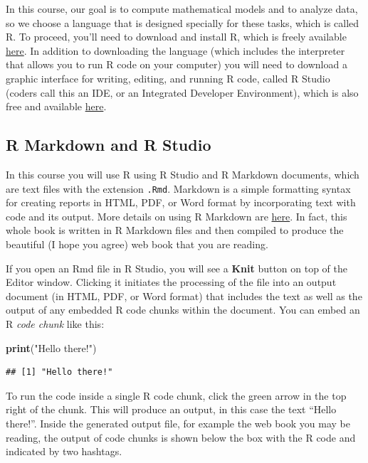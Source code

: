 \documentclass[
]{book}
\newenvironment{Shaded}{\begin{snugshade}}{\end{snugshade}}
\newcommand{\KeywordTok}[1]{\textcolor[rgb]{0.13,0.29,0.53}{\textbf{#1}}}
\newcommand{\NormalTok}[1]{#1}
\newcommand{\StringTok}[1]{\textcolor[rgb]{0.31,0.60,0.02}{#1}}
\begin{document}
In this course, our goal is to compute mathematical models and to analyze data, so we choose a language that is designed specially for these tasks, which is called R. To proceed, you'll need to download and install R, which is freely available \href{cran.r-project.org/}{here}. In addition to downloading the language (which includes the interpreter that allows you to run R code on your computer) you will need to download a graphic interface for writing, editing, and running R code, called R Studio (coders call this an IDE, or an Integrated Developer Environment), which is also free and available \href{www.rstudio.com/products/rstudio/download/}{here}.

\hypertarget{r-markdown-and-r-studio}{%
\subsection{R Markdown and R Studio}\label{r-markdown-and-r-studio}}

In this course you will use R using R Studio and R Markdown documents, which are text files with the extension \texttt{.Rmd}. Markdown is a simple formatting syntax for creating reports in HTML, PDF, or Word format by incorporating text with code and its output. More details on using R Markdown are \href{rmarkdown.rstudio.com}{here}. In fact, this whole book is written in R Markdown files and then compiled to produce the beautiful (I hope you agree) web book that you are reading.

If you open an Rmd file in R Studio, you will see a \textbf{Knit} button on top of the Editor window. Clicking it initiates the processing of the file into an output document (in HTML, PDF, or Word format) that includes the text as well as the output of any embedded R code chunks within the document. You can embed an R \emph{code chunk} like this:

\begin{Shaded}
\begin{Highlighting}[]
\KeywordTok{print}\NormalTok{(}\StringTok{"Hello there!"}\NormalTok{) }
\end{Highlighting}
\end{Shaded}

\begin{verbatim}
## [1] "Hello there!"
\end{verbatim}

To run the code inside a single R code chunk, click the green arrow in the top right of the chunk. This will produce an output, in this case the text ``Hello there!''. Inside the generated output file, for example the web book you may be reading, the output of code chunks is shown below the box with the R code and indicated by two hashtags.
\end{document}

